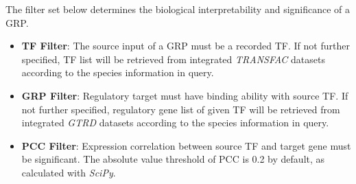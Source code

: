 \documentclass[fleqn,10pt]{wlscirep}
\begin{document}
\begin{enumerate}
The filter set below determines the biological interpretability and significance of a GRP.
\begin{itemize}
\setlength\itemsep{0em}
\item \textbf{TF Filter}: The source input of a GRP must be a recorded TF.
If not further specified, TF list will be retrieved from integrated \emph{TRANSFAC}\cite{transfac} datasets according to the species information in query.
\item \textbf{GRP Filter}: Regulatory target must have binding ability with source TF.
If not further specified, regulatory gene list of given TF will be retrieved from integrated \emph{GTRD}\cite{gkaa1057} datasets according to the species information in query.
\item \textbf{PCC Filter}: Expression correlation between source TF and target gene must be significant.
The absolute value threshold of PCC is 0.2 by default, as calculated with \emph{SciPy}\cite{2020SciPy-NMeth}.
\end{itemize}
\end{enumerate}

\end{document}
